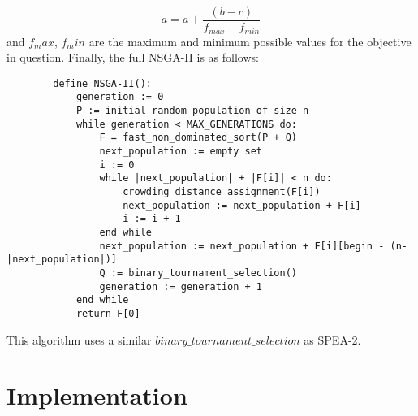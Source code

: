 \documentclass{article}
\begin{document}
    \begin{equation*}
        a = a + \dfrac{(b - c)}{f_{max} - f_{min}}
    \end{equation*}
    and \(f_max\), \(f_min\) are the maximum and minimum possible values for the objective in question. 
    Finally, the full NSGA-II is as follows:
    \begin{lstlisting}
        define NSGA-II():
            generation := 0
            P := initial random population of size n
            while generation < MAX_GENERATIONS do:
                F = fast_non_dominated_sort(P + Q)
                next_population := empty set
                i := 0
                while |next_population| + |F[i]| < n do:
                    crowding_distance_assignment(F[i])
                    next_population := next_population + F[i]
                    i := i + 1
                end while
                next_population := next_population + F[i][begin - (n-|next_population|)]
                Q := binary_tournament_selection()
                generation := generation + 1
            end while
            return F[0]
    \end{lstlisting}
    This algorithm uses a similar \(binary\_tournament\_selection\) as SPEA-2.
    \cite{DebPratapAgarwalMeyarivan} \cite{PonsichJaimesCoello}
    \section{Implementation}
\end{document}
